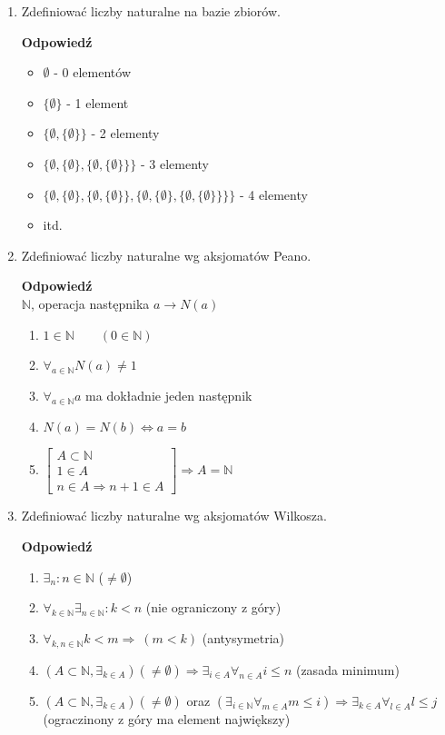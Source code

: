 \documentclass[12pt,a4paper]{article}
\theoremstyle{break}
\newcommand{\Odp}[1]{
		\begin{mdframed}[style=zadanie]
			\textbf{Odpowiedź}\\
			#1
		\end{mdframed}
	}
\begin{document}
\begin{enumerate}[1.]
	\item Zdefiniować liczby naturalne na bazie zbiorów.
	\Odp{
		\begin{itemize}
			\item $\emptyset$ - 0 elementów
			\item $\{\emptyset\}$ - 1 element
			\item $\{\emptyset,\{\emptyset\}\}$ - 2 elementy
			\item $\{\emptyset,\{\emptyset\},\{\emptyset,\{\emptyset\}\}\}$ - 3 elementy
			\item $\{\emptyset,\{\emptyset\},\{\emptyset,\{\emptyset\}\},\{\emptyset,\{\emptyset\},\{\emptyset,\{\emptyset\}\}\}\}$ - 4 elementy
			\item itd.
		\end{itemize}
	}
	
	\item Zdefiniować liczby naturalne wg aksjomatów Peano.
	\Odp{
			$\mathbb{N}$, operacja następnika $a \rightarrow N(a)$
			\begin{enumerate}[1)]
				\item $1\in \mathbb{N} \qquad (0\in \mathbb{N})$
				\item $\forall_{a\in\mathbb{N}} N(a)\neq 1$
				\item $\forall_{a\in \mathbb{N}} a$ ma dokładnie jeden następnik
				\item $N(a)=N(b) \Leftrightarrow a=b$
				\item $\begin{bmatrix}
					A\subset \mathbb{N}\\
					1\in A\\
					n\in A \Rightarrow n+1\in A
				\end{bmatrix} \Rightarrow A=\mathbb{N}$
			\end{enumerate}
	}
	
	\item Zdefiniować liczby naturalne wg aksjomatów Wilkosza.
	\Odp{
	\begin{enumerate}[1)]
		\item $\exists_n : n\in\mathbb{N}$ ($\neq \emptyset$)
		\item $\forall_{k\in\mathbb{N}} \exists_{n\in\mathbb{N}}:k<n$ (nie ograniczony z góry)
		\item $\forall_{k,n\in \mathbb{N}} k<m \Rightarrow ~(m<k)$ (antysymetria)
		\item $(A\subset\mathbb{N}, \exists_{k\in A})(\neq\emptyset) \Rightarrow \exists_{i\in A} \forall_{n\in A} i\leq n$ (zasada minimum)
		\item $(A\subset\mathbb{N}, \exists_{k\in A})(\neq\emptyset)$ oraz  $ (\exists_{i\in \mathbb{N}} \forall_{m\in A} m\leq i)\Rightarrow \exists_{k\in A} \forall_{l\in A} l\leq j$ (ograczinony z góry ma element największy)
	\end{enumerate}
	}
	

\end{enumerate}
\end{document}
